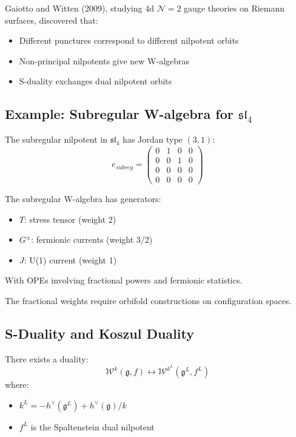 Gaiotto and Witten (2009), studying 4d $\mathcal{N}=2$ gauge theories on Riemann surfaces, discovered that:
\begin{itemize}
\item Different punctures correspond to different nilpotent orbits
\item Non-principal nilpotents give new W-algebras
\item S-duality exchanges dual nilpotent orbits
\end{itemize}

\subsection{Example: Subregular W-algebra for $\mathfrak{sl}_4$}

\begin{definition}
The subregular nilpotent in $\mathfrak{sl}_4$ has Jordan type $(3,1)$:
\[
e_{subreg} = \begin{pmatrix} 0 & 1 & 0 & 0 \\ 0 & 0 & 1 & 0 \\ 0 & 0 & 0 & 0 \\ 0 & 0 & 0 & 0 \end{pmatrix}
\]
\end{definition}

\begin{theorem}
The subregular W-algebra has generators:
\begin{itemize}
\item $T$: stress tensor (weight 2)
\item $G^{\pm}$: fermionic currents (weight 3/2)
\item $J$: U(1) current (weight 1)
\end{itemize}
With OPEs involving fractional powers and fermionic statistics.
\end{theorem}

The fractional weights require orbifold constructions on configuration spaces.

\subsection{S-Duality and Koszul Duality}

\begin{theorem}
There exists a duality:
\[
\mathcal{W}^k(\mathfrak{g}, f) \longleftrightarrow \mathcal{W}^{k^L}(\mathfrak{g}^L, f^L)
\]
where:
\begin{itemize}
\item $k^L = -h^{\vee}(\mathfrak{g}^L) + h^{\vee}(\mathfrak{g})/k$
\item $f^L$ is the Spaltenstein dual nilpotent
\end{itemize}
\end{theorem}


